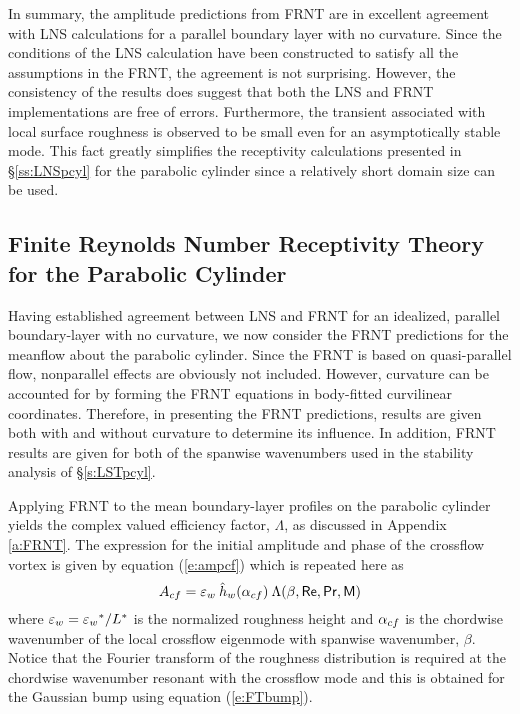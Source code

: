 In summary, the amplitude predictions from FRNT are in excellent agreement
with LNS calculations for a parallel boundary layer with no curvature.  Since
the conditions of the LNS calculation have been constructed to satisfy all the
assumptions in the FRNT, the agreement is not surprising.  However, the
consistency of the results does suggest that both the LNS and FRNT
implementations are free of errors.  Furthermore, the transient associated
with local surface roughness is observed to be small even for an
asymptotically stable mode.  This fact greatly simplifies the receptivity
calculations presented in \S\ref{ss:LNSpcyl} for the parabolic cylinder since
a relatively short domain size can be used.

\subsection[Finite Reynolds Number Receptivity Theory for the \protect\\
Parabolic Cylinder]{Finite Reynolds Number Receptivity Theory for the 
Parabolic Cylinder\label{ss:FRNTpcyl} }

Having established agreement between LNS and FRNT for an idealized, parallel
boundary-layer with no curvature, we now consider the FRNT predictions for the
meanflow about the parabolic cylinder.  Since the FRNT is based on
quasi-parallel flow, nonparallel effects are obviously not included.  However,
curvature can be accounted for by forming the FRNT equations in body-fitted
curvilinear coordinates.  Therefore, in presenting the FRNT predictions,
results are given both with and without curvature to determine its influence.
In addition, FRNT results are given for both of the spanwise wavenumbers used
in the stability analysis of \S\ref{s:LSTpcyl}.

Applying FRNT to the mean boundary-layer profiles on the parabolic cylinder
yields the complex valued efficiency factor, $\Lambda$, as discussed in
Appendix \ref{a:FRNT}.  The expression for the initial amplitude and phase of
the crossflow vortex is given by equation (\ref{e:ampcf}) which is repeated
here as
%
\begin{equation} \label{e:ampCF}
  A_{cf} = {\varepsilon_w} \: \hat h_w({\alpha_{cf}}) \: \Lambda(\beta,{\sf Re},{\sf Pr},{\sf M})
\end{equation}
%
where ${\varepsilon_w} = {\varepsilon_w}^* / L^*$ is the normalized roughness height and ${\alpha_{cf}}$ is the
chordwise wavenumber of the local crossflow eigenmode with spanwise
wavenumber, $\beta$.  Notice that the Fourier transform of the roughness
distribution is required at the chordwise wavenumber resonant with the
crossflow mode and this is obtained for the Gaussian bump using equation
(\ref{e:FTbump}).

